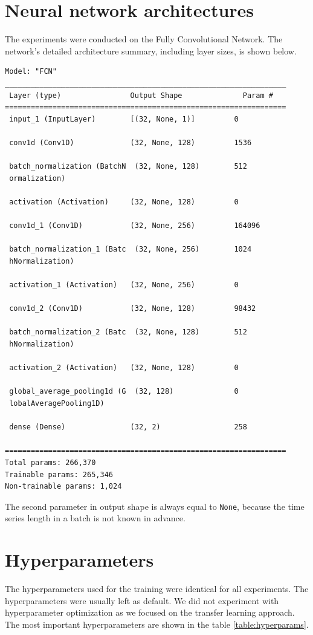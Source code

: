 \documentclass[a4paper,11pt,twoside]{report}
\theoremstyle{definition}
\begin{document}
\section{Neural network architectures}
The experiments were conducted on the Fully Convolutional Network. The network's detailed architecture summary, including layer sizes, is shown below. \begin{verbatim}
Model: "FCN"
_________________________________________________________________
 Layer (type)                Output Shape              Param #
=================================================================
 input_1 (InputLayer)        [(32, None, 1)]         0

 conv1d (Conv1D)             (32, None, 128)         1536

 batch_normalization (BatchN  (32, None, 128)        512
 ormalization)

 activation (Activation)     (32, None, 128)         0

 conv1d_1 (Conv1D)           (32, None, 256)         164096

 batch_normalization_1 (Batc  (32, None, 256)        1024
 hNormalization)

 activation_1 (Activation)   (32, None, 256)         0

 conv1d_2 (Conv1D)           (32, None, 128)         98432

 batch_normalization_2 (Batc  (32, None, 128)        512
 hNormalization)

 activation_2 (Activation)   (32, None, 128)         0

 global_average_pooling1d (G  (32, 128)              0
 lobalAveragePooling1D)

 dense (Dense)               (32, 2)                 258

=================================================================
Total params: 266,370
Trainable params: 265,346
Non-trainable params: 1,024
\end{verbatim}
The second parameter in output shape is always equal to \texttt{None}, because the time series length in a batch is not known in advance.
\section{Hyperparameters}\label{section:hyperparameters}
The hyperparameters used for the training were identical for all experiments. The hyperparameters were usually left as default. We did not experiment with hyperparameter optimization as we focused on the transfer learning approach. The most important hyperparameters are shown in the table \ref{table:hyperparams}.
\end{document}
